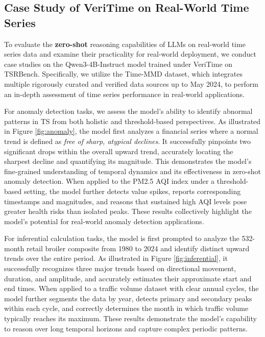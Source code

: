 \documentclass{article}
\theoremstyle{plain}
\theoremstyle{definition}
\theoremstyle{remark}
\begin{document}
\subsection{Case Study of VeriTime on Real-World Time Series}
\label{apdx:case_study}

To evaluate the \textbf{zero-shot} reasoning capabilities of LLMs on real-world time series data and examine their practicality for real-world deployment, we conduct case studies on the Qwen3-4B-Instruct model trained under VeriTime on TSRBench. Specifically, we utilize the Time-MMD \cite{liu2024timemmd} dataset, which integrates multiple rigorously curated and verified data sources up to May 2024, to perform an in-depth assessment of time series performance in real-world applications.

For anomaly detection tasks, we assess the model’s ability to identify abnormal patterns in TS from both holistic and threshold-based perspectives. As illustrated in Figure \ref{fig:anomaly}, the model first analyzes a financial series where a normal trend is defined as \textit{free of sharp, atypical declines}. It successfully pinpoints two significant drops within the overall upward trend, accurately locating the sharpest decline and quantifying its magnitude. This demonstrates the model’s fine-grained understanding of temporal dynamics and its effectiveness in zero-shot anomaly detection. When applied to the PM2.5 AQI index under a threshold-based setting, the model further detects value spikes, reports corresponding timestamps and magnitudes, and reasons that sustained high AQI levels pose greater health risks than isolated peaks. These results collectively highlight the model’s potential for real-world anomaly detection applications.

For inferential calculation tasks, the model is first prompted to analyze the 532-month retail broiler composite from 1980 to 2024 and identify distinct upward trends over the entire period. As illustrated in Figure \ref{fig:inferential}, it successfully recognizes three major trends based on directional movement, duration, and amplitude, and accurately estimates their approximate start and end times. When applied to a traffic volume dataset with clear annual cycles, the model further segments the data by year, detects primary and secondary peaks within each cycle, and correctly determines the month in which traffic volume typically reaches its maximum. These results demonstrate the model’s capability to reason over long temporal horizons and capture complex periodic patterns.
\end{document}
